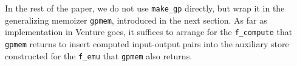 




In the rest of the paper, we do not use \texttt{make\_gp} directly,
but wrap it in the generalizing memoizer \texttt{gpmem}, introduced in
the next section.  As far as implementation in Venture goes, it
suffices to arrange for the \texttt{f\_compute} that \texttt{gpmem}
returns to insert computed input-output pairs into the auxiliary store
constructed for the \texttt{f\_emu} that \texttt{gpmem} also returns.
